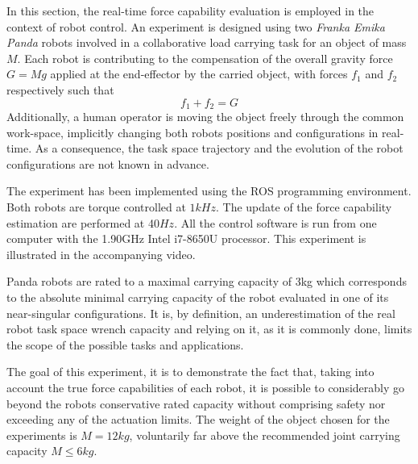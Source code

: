In this section, the real-time force capability evaluation is employed in the context of robot control. An experiment is designed using two \textit{Franka Emika Panda} robots involved in a collaborative load carrying task for an object of mass $M$. Each robot is contributing to the compensation of the overall gravity force $G=Mg$ applied at the end-effector by the carried object, with forces $f_1$ and $f_2$ respectively such that
\begin{equation}
    f_1 + f_2 = G
\end{equation}
Additionally, a human operator is moving the object freely through the common work-space, implicitly changing both robots positions and configurations in real-time. As a consequence, the task space trajectory and the evolution of the robot configurations are not known in advance.

The experiment has been implemented using the ROS programming environment. Both robots are torque controlled at $1 kHz$. The update of the force capability estimation are performed at 40$Hz$. All the control software is run from one computer with the 1.90GHz Intel i7-8650U processor. This experiment is illustrated in the accompanying video.

Panda robots are rated to a maximal carrying capacity of 3kg which corresponds to the absolute minimal carrying capacity of the robot evaluated in one of its near-singular configurations. It is, by definition, an underestimation of the real robot task space wrench capacity and relying on it, as it is commonly done, limits the scope of the possible tasks and applications.

The goal of this experiment, it is to demonstrate the fact that, taking into account the true force capabilities of each robot, it is possible to considerably go beyond the robots conservative rated capacity without comprising safety nor exceeding any of the actuation limits. The weight of the object chosen for the experiments is $M=12kg$, voluntarily far above the recommended joint carrying capacity $M \le 6kg$. 

